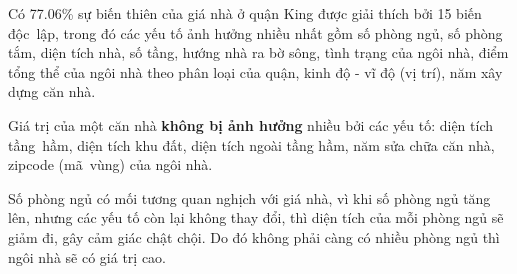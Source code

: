 Có 77.06\% sự biến thiên của giá nhà ở quận King được giải thích bởi 15 biến độc~lập, trong đó các yếu tố ảnh hưởng nhiều nhất gồm số phòng ngủ, số phòng tắm, diện tích nhà, số tầng, hướng nhà ra bờ sông, tình trạng của ngôi nhà, điểm tổng thể của ngôi nhà theo phân loại của quận, kinh độ - vĩ độ (vị trí), năm xây dựng căn nhà.

Giá trị của một căn nhà \textbf{không bị ảnh hưởng} nhiều bởi các yếu tố: diện tích tầng~hầm, diện tích khu đất, diện tích ngoài tầng hầm, năm sửa chữa căn nhà, zipcode (mã~vùng) của ngôi nhà. 

Số phòng ngủ có mối tương quan nghịch với giá nhà, vì khi số phòng ngủ tăng lên, nhưng các yếu tố còn lại không thay đổi, thì diện tích của mỗi phòng ngủ sẽ giảm đi, gây cảm giác chật chội. Do đó không phải càng có nhiều phòng ngủ thì ngôi nhà sẽ có giá trị cao. 

